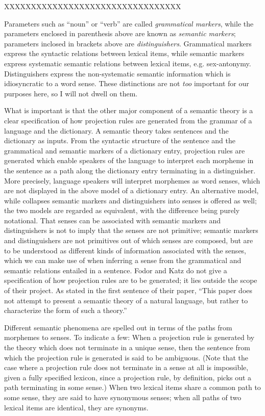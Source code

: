 \documentclass[12pt]{amsart}
\begin{document}
XXXXXXXXXXXXXXXXXXXXXXXXXXXXXXXXX

\noindent Parameters such as ``noun'' or ``verb'' are called \emph{grammatical markers}, while the parameters enclosed in parenthesis above are known as \emph{semantic markers}; parameters inclosed in brackets above are \emph{distinguishers}. Grammatical markers express the syntactic relations between lexical items, while semantic markers express systematic semantic relations between lexical items, e.g. sex-antonymy. Distinguishers express the non-systematic semantic information which is idiosyncratic to a word sense. These distinctions are not \emph{too} important for our purposes here, so I will not dwell on them.

What is important is that the other major component of a semantic theory is a clear specification of how projection rules are generated from the grammar of a language and the dictionary. A semantic theory takes sentences and the dictionary as inputs. From the syntactic structure of the sentence and the grammatical and semantic markers of a dictionary entry, projection rules are generated which enable speakers of the language to interpret each morpheme in the sentence as a path along the dictionary entry terminating in a distinguisher. More precisely, language speakers will interpret morphemes as word senses, which are not displayed in the above model of a dictionary entry. An alternative model, while collapses semantic markers and distinguishers into senses is offered as well; the two models are regarded as equivalent, with the difference being purely notational. That senses can be associated with semantic markers and distinguishers is not to imply that the senses are not primitive; semantic markers and distinguishers are not primitives out of which senses are composed, but are to be understood as different kinds of information associated with the senses, which we can make use of when inferring a sense from the grammatical and semantic relations entailed in a sentence. Fodor and Katz do not give a specification of how projection rules are to be generated; it lies outside the scope of their project. As stated in the first sentence of their paper, ``This paper does not attempt to present a semantic theory of a natural language, but rather to characterize the form of such a theory.''

Different semantic phenomena are spelled out in terms of the paths from morphemes to senses. To indicate a few: When a projection rule is generated by the theory which does not terminate in a unique sense, then the sentence from which the projection rule is generated is said to be ambiguous. (Note that the case where a projection rule does not terminate in a sense at all is impossible, given a fully specified lexicon, since a projection rule, by definition, picks out a path terminating in some sense.) When two lexical items share a common path to some sense, they are said to have synonymous senses; when all paths of two lexical items are identical, they are synonyms.
\end{document}
